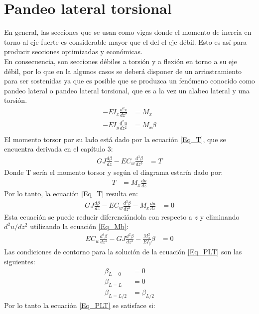\section{Pandeo lateral torsional}
En general, las secciones que se usan como vigas donde el momento de inercia en torno al eje fuerte es considerable mayor que el del el eje débil. Esto es así para producir secciones optimizadas y económicas.\\
En consecuencia, son secciones débiles a torsión y a flexión en torno a su eje débil, por lo que en la algunos casos se deberá disponer de un arriostramiento para ser sostenidas ya que es posible que se produzca un fenómeno conocido como pandeo lateral o pandeo lateral torsional, que es a la vez un alabeo lateral y una torsión.
\begin{align}
    \label{Eq_Mx}
    -EI_x\frac{d^2v}{dz^2} &= M_x\\
    \label{Eq_Mb}
    -EI_y\frac{d^2u}{dz^2} &= M_x\beta\\
\end{align}
El momento torsor por su lado está dado por la ecuación \ref{Eq_T}, que se encuentra derivada en el capítulo 3:
\begin{align}
    \label{Eq_T}
    GJ\frac{d\beta}{dz}-EC_w\frac{d^3\beta}{dz^3} &= T
\end{align}
Donde T sería el momento torsor y según el diagrama estaría dado por:
\begin{align}
    \label{Eq_T_Mx}
    T &= M_x\frac{du}{dz}
\end{align}
Por lo tanto, la ecuación \ref{Eq_T} resulta en:
\begin{align}
    GJ\frac{d\beta}{dz}-EC_w\frac{d^3\beta}{dz^3} - M_x\frac{du}{dz}&= 0
\end{align}
Esta ecuación se puede reducir diferenciándola con respecto a $z$ y eliminando $d^2u/dz^2$ utilizando la ecuación \ref{Eq_Mb}:\\
\begin{align}
\label{Eq_PLT}
     EC_w\frac{d^4\beta}{dz^4}- GJ\frac{d^2\beta}{dz^2} - \frac{M_x^2}{EI_y}\beta &= 0
\end{align}
Las condiciones de contorno para la solución de la ecuación \ref{Eq_PLT} son las siguientes:
\begin{align*}
    \beta_{L=0} &= 0\\
    \beta_{L=L} &= 0\\
    \beta_{L=L/2} &= \beta_{L/2}
\end{align*}
Por lo tanto la ecuación \ref{Eq_PLT} se satisface si:
